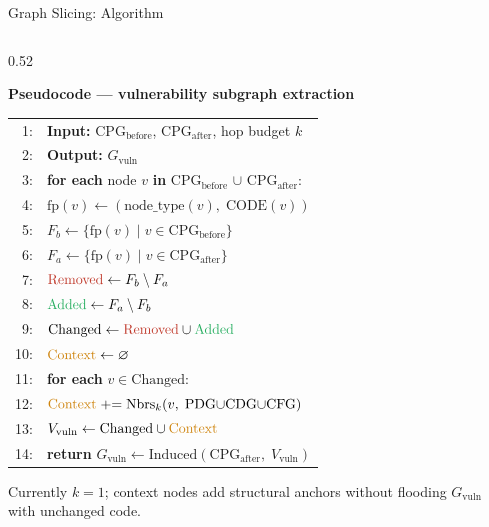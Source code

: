 \documentclass[aspectratio=169,10pt]{beamer}
\begin{document}
\begin{frame}[fragile]{Graph Slicing: Algorithm}
\begin{columns}[T]
  \begin{column}{0.52\textwidth}

    \textbf{Pseudocode — vulnerability subgraph extraction}

    \vspace{0.3em}
    {\scriptsize
    \begin{tabular}{@{}r@{\;\;}l}
      1: & \textbf{Input:} CPG$_{\text{before}}$, CPG$_{\text{after}}$, hop budget $k$ \\
      2: & \textbf{Output:} $G_{\text{vuln}}$ \\[2pt]
      3: & \textbf{for each} node $v$ \textbf{in} CPG$_{\text{before}}$ $\cup$ CPG$_{\text{after}}$: \\
      4: & \quad $\text{fp}(v) \gets (\text{node\_type}(v),\;\text{CODE}(v))$ \\[2pt]
      5: & $F_b \gets \{ \text{fp}(v) \mid v \in \text{CPG}_{\text{before}} \}$ \\
      6: & $F_a \gets \{ \text{fp}(v) \mid v \in \text{CPG}_{\text{after}} \}$ \\[2pt]
      7: & $\textcolor{miss}{\text{Removed}} \gets F_b \setminus F_a$ \\
      8: & $\textcolor{hit}{\text{Added}} \gets F_a \setminus F_b$ \\
      9: & $\text{Changed} \gets \textcolor{miss}{\text{Removed}} \cup \textcolor{hit}{\text{Added}}$ \\[2pt]
    10: & $\textcolor{warn!85!black}{\text{Context}} \gets \varnothing$ \\
    11: & \textbf{for each} $v \in \text{Changed}$: \\
    12: & \quad $\textcolor{warn!85!black}{\text{Context}} \mathrel{{+}{=}}
            \text{Nbrs}_{k}(v,\;\text{PDG}{\cup}\text{CDG}{\cup}\text{CFG})$ \\[2pt]
    13: & $V_{\text{vuln}} \gets \text{Changed} \cup \textcolor{warn!85!black}{\text{Context}}$ \\
    14: & \textbf{return} $G_{\text{vuln}} \gets
            \text{Induced}(\text{CPG}_{\text{after}},\;V_{\text{vuln}})$
    \end{tabular}}

    \vspace{0.4em}
    {\scriptsize Currently $k = 1$; context nodes add structural
    anchors without flooding $G_{\text{vuln}}$ with unchanged code.}


\end{column}
\end{columns}
\end{frame}
\end{document}
